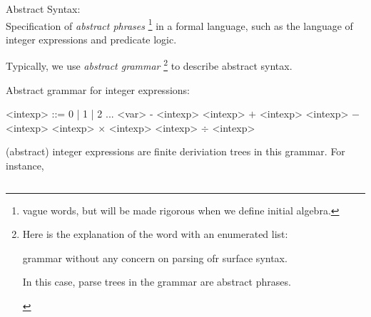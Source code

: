 \begin{enumcirc}
  \item Abstract Syntax: \\
    Specification of \emph{abstract phrases}
    \footnote{
      vague words, but will be made rigorous when we define initial algebra.
    }
    in a formal language, such as the language of integer expressions and
    predicate logic.
  \item
    Typically, we use \emph{abstract grammar}
    \footnote{
      \begin{minipage}[t]{\textwidth}
      Here is the explanation of the word with an enumerated list:
      \begin{enumrm}
        \item grammar without any concern on parsing ofr surface syntax.
        \item In this case, parse trees in the grammar are abstract phrases.
      \end{enumrm}
      \end{minipage}
    }
    to describe abstract syntax.
  \item Abstract grammar for integer expressions:
    \setlength{\grammarindent}{6em} %
    \begin{center}
    \begin{minipage}{0.4\textwidth}
    \begin{grammar}
    <intexp> ::= 0 | 1 | 2 ...
    \alt <var>
    \alt - <intexp>
    \alt <intexp> $+$ <intexp>
    \alt <intexp> $-$ <intexp>
    \alt <intexp> $\times$ <intexp>
    \alt <intexp> $\div$ <intexp>
    \end{grammar}
    \end{minipage}
    \end{center}
    (abstract) integer expressions are finite deriviation trees in this grammar.
    For instance,

    \begin{center}
    $\qquad$
    \begin{tikzpicture}[
      level 1/.style={sibling distance=20mm, level distance=10mm},
      level 2/.style={sibling distance=10mm},
      level 3/.style={sibling distance=5mm}]


\end{tikzpicture}
\end{center}
\end{enumcirc}
